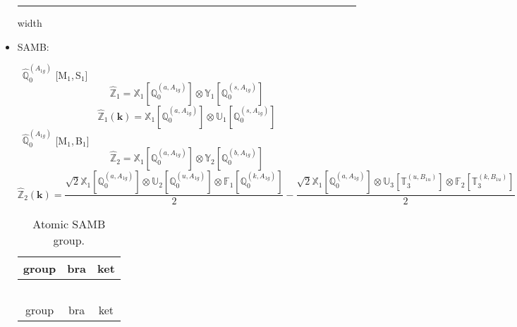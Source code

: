 \documentclass[fleqn,10pt,landscape]{article}
\begin{document}
\begin{itemize}
 \hfil \hrule height 1mm width \textwidth \hfil

\item SAMB:

\vspace{4mm}
\noindent {} $\,\,\,\hat{\mathbb{Q}}_{0}^{(A_{1g})}$ [M$_{1}$,\,S$_{1}$]
\begin{dmath*}
\hat{\mathbb{Z}}_{1}=\mathbb{X}_{1}[\mathbb{Q}_{0}^{(a,A_{1g})}] \otimes\mathbb{Y}_{1}[\mathbb{Q}_{0}^{(s,A_{1g})}]
\end{dmath*}
\begin{dmath*}
\hat{\mathbb{Z}}_{1}(\bm{k})=\mathbb{X}_{1}[\mathbb{Q}_{0}^{(a,A_{1g})}] \otimes\mathbb{U}_{1}[\mathbb{Q}_{0}^{(s,A_{1g})}]
\end{dmath*}
\vspace{4mm}
\noindent {} $\,\,\,\hat{\mathbb{Q}}_{0}^{(A_{1g})}$ [M$_{1}$,\,B$_{1}$]
\begin{dmath*}
\hat{\mathbb{Z}}_{2}=\mathbb{X}_{1}[\mathbb{Q}_{0}^{(a,A_{1g})}] \otimes\mathbb{Y}_{2}[\mathbb{Q}_{0}^{(b,A_{1g})}]
\end{dmath*}
\begin{dmath*}
\hat{\mathbb{Z}}_{2}(\bm{k})=\frac{\sqrt{2} \mathbb{X}_{1}[\mathbb{Q}_{0}^{(a,A_{1g})}] \otimes\mathbb{U}_{2}[\mathbb{Q}_{0}^{(u,A_{1g})}] \otimes\mathbb{F}_{1}[\mathbb{Q}_{0}^{(k,A_{1g})}]}{2} - \frac{\sqrt{2} \mathbb{X}_{1}[\mathbb{Q}_{0}^{(a,A_{1g})}] \otimes\mathbb{U}_{3}[\mathbb{T}_{3}^{(u,B_{1u})}] \otimes\mathbb{F}_{2}[\mathbb{T}_{3}^{(k,B_{1u})}]}{2}
\end{dmath*}
\begin{center}
\renewcommand{\arraystretch}{1.3}
\begin{longtable}{c|c|c}
\caption{Atomic SAMB group.}
 \\
 \hline \hline
group & bra & ket \\ \hline \endfirsthead

\multicolumn{2}{l}{\tablename\ \thetable{}} \\
 \hline \hline
group & bra & ket \\ \hline \endhead


\end{longtable}
\end{center}
\end{itemize}
\end{document}
